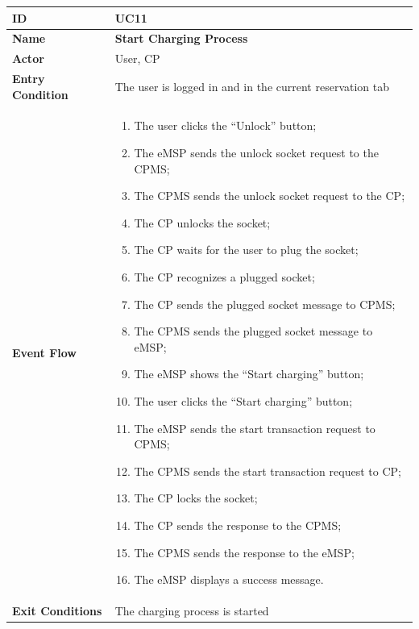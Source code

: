 \documentclass{Configuration_Files/PoliMi3i_thesis}
\begin{document}

\begin{table}[H]
    \begin{xltabular}{\textwidth}{| >{}l | X |}
    \hline
    \textbf{ID} & \textbf{UC11}\T\B\\
    \hline
    \textbf{Name} & \textbf{Start Charging Process}\T\B\\
    \hline \hline
    \textbf{Actor} & User, CP\T\B \\
    \hline
    \textbf{Entry Condition} & The user is logged in and in the current reservation tab\T\B\\
    \hline
    \textbf{Event Flow} & 
        \begin{enumerate}
        \item The user clicks the “Unlock” button;
        \item The eMSP sends the unlock socket request to the CPMS;
        \item The CPMS sends the unlock socket request to the CP;
        \item The CP unlocks the socket;
        \item The CP waits for the user to plug the socket;
        \item The CP recognizes a plugged socket;
        \item The CP sends the plugged socket message to CPMS;
        \item The CPMS sends the plugged socket message to eMSP;
        \item The eMSP shows the “Start charging” button;
        \item The user clicks the “Start charging” button;
        \item The eMSP sends the start transaction request to CPMS;
        \item The CPMS sends the start transaction request to CP;
        \item The CP locks the socket;
        \item The CP sends the response to the CPMS; 
        \item The CPMS sends the response to the eMSP;
        \item The eMSP displays a success message.
        \end{enumerate}\B\\
    \hline
    \textbf{Exit Conditions} & The charging process is started\B\\

\end{xltabular}
\end{table}
\end{document}
